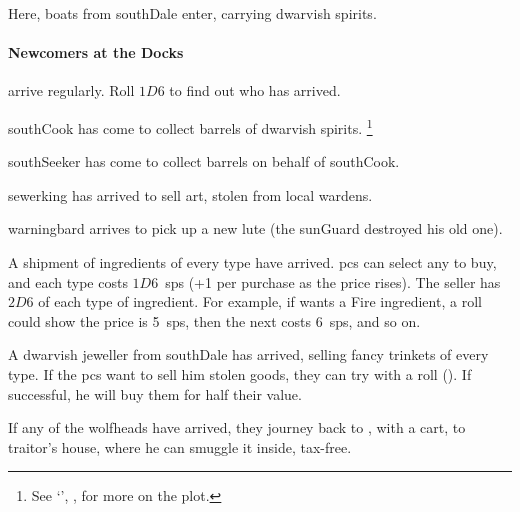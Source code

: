 \begin{multicols}{2}

Here, boats from \gls{southDale} enter, carrying dwarvish spirits.

\paragraph{Newcomers at the Docks}
arrive regularly.
Roll $1D6$ to find out who has arrived.

\begin{dlist}
  \item
  \Gls{southCook} has come to collect barrels of dwarvish spirits.%
  \footnote{See `', , for more on the plot.}
  \item
  \Gls{southSeeker} has come to collect barrels on behalf of \gls{southCook}.
  \item
  \Gls{sewerking} has arrived to sell art, stolen from local \glspl{warden}.
  \item
  \Gls{warningbard} arrives to pick up a new lute (the \gls{sunGuard} destroyed his old one).
  \item
  A shipment of \glspl{ingredient} of every type have arrived.
  \Glspl{pc} can select any to buy, and each type costs $1D6$~\glspl{sp} (+1 per purchase as the price rises).
  The seller has $2D6$ of each type of \gls{ingredient}.
  For example, if  wants a Fire \gls{ingredient}, a roll could show the price is 5~\glspl{sp}, then the next costs 6~\glspl{sp}, and so on.
  \item
  A dwarvish jeweller from \gls{southDale} has arrived, selling fancy trinkets of every type.
  If the \glspl{pc} want to sell him stolen goods, they can try with a  roll (\tn[12]).
  If successful, he will buy them for half their value.
\end{dlist}

If any of the \glspl{wolfhead} have arrived, they journey back to , with a cart, to \gls{traitor}'s house, where he can smuggle it inside, tax-free.



\end{multicols}
